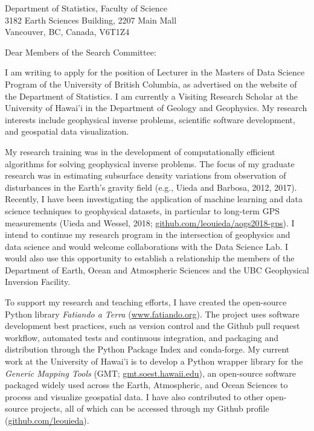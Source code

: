 \documentclass[11pt]{letter}
\begin{document}
\begin{letter}{
    Department of Statistics, Faculty of Science
    \\
    3182 Earth Sciences Building, 2207 Main Mall
    \\
    Vancouver, BC, Canada, V6T1Z4
}
\opening{Dear Members of the Search Committee:}

I am writing to apply for the position of Lecturer in the Masters of Data
Science Program of the University of British Columbia, as advertised on the
website of the Department of Statistics.
I am currently a Visiting Research Scholar at the University of Hawai'i in the
Department of Geology and Geophysics.
My research interests include geophysical inverse problems, scientific
software development, and geospatial data visualization.

My research training was in the development of computationally efficient
algorithms for solving geophysical inverse problems.
The focus of my graduate research was in estimating subsurface density
variations from observation of disturbances in the Earth's gravity field (e.g.,
Uieda and Barbosa, 2012, 2017).
Recently, I have been investigating the application of machine learning and
data science techniques to geophysical datasets,
in particular to long-term GPS measurements
(Uieda and Wessel, 2018;
\href{https://github.com/leouieda/aogs2018-gps}{github.com/leouieda/aogs2018-gps}).
I intend to continue my research program in the intersection of geophysics and
data science and would welcome collaborations with the Data Science Lab.
I would also use this opportunity to establish a relationship the members of
the Department of Earth, Ocean and Atmospheric Sciences and the
UBC Geophysical Inversion Facility.

To support my research and teaching efforts, I have created the open-source
Python library \textit{Fatiando a Terra}
(\href{http://www.fatiando.org/}{www.fatiando.org}).
The project uses software development best practices, such as version control
and the Github pull request workflow,
automated tests and continuous integration,
and packaging and distribution through the Python Package Index and
conda-forge.
My current work at the University of Hawai'i is to develop a Python wrapper
library for the \textit{Generic Mapping Tools}
(GMT; \href{http://gmt.soest.hawaii.edu/}{gmt.soest.hawaii.edu}),
an open-source software packaged widely used across the Earth, Atmospheric, and
Ocean Sciences to process and visualize geospatial data.
I have also contributed to other open-source projects, all of which can be
accessed through my Github profile
(\href{https://github.com/leouieda/}{github.com/leouieda}).


\end{letter}
\end{document}
